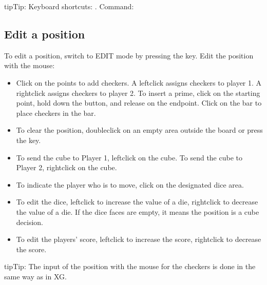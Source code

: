 \documentclass[letterpaper,10pt,english]{sphinxmanual}
\begin{document}
\begin{sphinxadmonition}{tip}{Tip:}
\sphinxAtStartPar
Keyboard shortcuts: . Command: 
\end{sphinxadmonition}


\subsection{Edit a position}
\label{\detokenize{guide_utilisateur:editer-une-position}}\label{\detokenize{guide_utilisateur:guide-edit-position}}
\sphinxAtStartPar
To edit a position, switch to EDIT mode by pressing the  key. Edit the position with the mouse:
\begin{itemize}
\item {} 
\sphinxAtStartPar
Click on the points to add checkers. A left\sphinxhyphen{}click assigns checkers to player 1. A right\sphinxhyphen{}click assigns checkers to player 2. To insert a prime, click on the starting point, hold down the button, and release on the endpoint. Click on the bar to place checkers in the bar.

\item {} 
\sphinxAtStartPar
To clear the position, double\sphinxhyphen{}click on an empty area outside the board or press the  key.

\item {} 
\sphinxAtStartPar
To send the cube to Player 1, left\sphinxhyphen{}click on the cube. To send the cube to Player 2, right\sphinxhyphen{}click on the cube.

\item {} 
\sphinxAtStartPar
To indicate the player who is to move, click on the designated dice area.

\item {} 
\sphinxAtStartPar
To edit the dice, left\sphinxhyphen{}click to increase the value of a die, right\sphinxhyphen{}click to decrease the value of a die. If the dice faces are empty, it means the position is a cube decision.

\item {} 
\sphinxAtStartPar
To edit the players’ score, left\sphinxhyphen{}click to increase the score, right\sphinxhyphen{}click to decrease the score.

\end{itemize}

\begin{sphinxadmonition}{tip}{Tip:}
\sphinxAtStartPar
The input of the position with the mouse for the checkers is done in the same way as in XG.
\end{sphinxadmonition}
\end{document}
